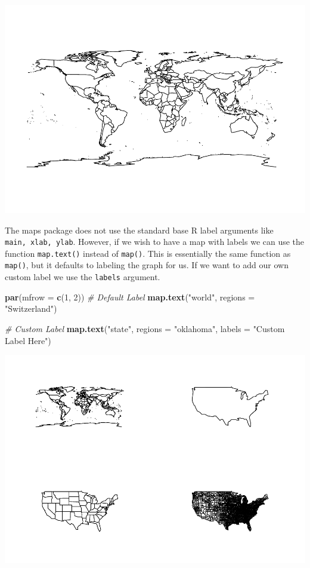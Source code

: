 \documentclass[
]{book}
\newenvironment{Shaded}{\begin{snugshade}}{\end{snugshade}}
\newcommand{\CommentTok}[1]{\textcolor[rgb]{0.56,0.35,0.01}{\textit{#1}}}
\newcommand{\DataTypeTok}[1]{\textcolor[rgb]{0.13,0.29,0.53}{#1}}
\newcommand{\DecValTok}[1]{\textcolor[rgb]{0.00,0.00,0.81}{#1}}
\newcommand{\KeywordTok}[1]{\textcolor[rgb]{0.13,0.29,0.53}{\textbf{#1}}}
\newcommand{\NormalTok}[1]{#1}
\newcommand{\StringTok}[1]{\textcolor[rgb]{0.31,0.60,0.02}{#1}}
\begin{document}
\includegraphics{_main_files/figure-latex/unnamed-chunk-194-1.pdf}

The maps package does not use the standard base R label arguments like \texttt{main,\ xlab,\ ylab}. However, if we wish to have a map with labels we can use the function \texttt{map.text()} instead of \texttt{map()}. This is essentially the same function as \texttt{map()}, but it defaults to labeling the graph for us. If we want to add our own custom label we use the \texttt{labels} argument.

\begin{Shaded}
\begin{Highlighting}[]
\KeywordTok{par}\NormalTok{(}\DataTypeTok{mfrow =} \KeywordTok{c}\NormalTok{(}\DecValTok{1}\NormalTok{, }\DecValTok{2}\NormalTok{))}
\CommentTok{# Default Label}
\KeywordTok{map.text}\NormalTok{(}\StringTok{"world"}\NormalTok{, }\DataTypeTok{regions =} \StringTok{"Switzerland"}\NormalTok{)}

\CommentTok{# Custom Label}
\KeywordTok{map.text}\NormalTok{(}\StringTok{"state"}\NormalTok{, }\DataTypeTok{regions =} \StringTok{"oklahoma"}\NormalTok{, }\DataTypeTok{labels =} \StringTok{"Custom Label Here"}\NormalTok{)}
\end{Highlighting}
\end{Shaded}

\includegraphics{_main_files/figure-latex/unnamed-chunk-195-1.pdf}
\end{document}
